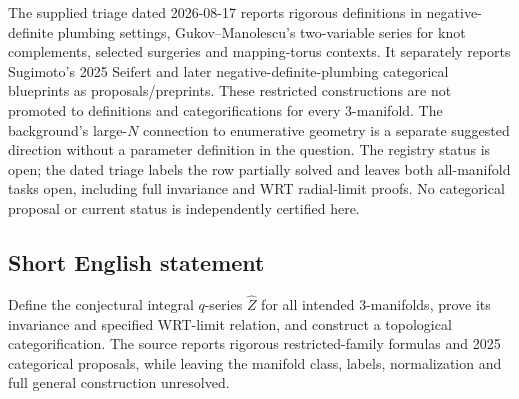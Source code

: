 \documentclass[11pt]{article}
\begin{document}
The supplied triage dated 2026-08-17 reports rigorous definitions in negative-definite plumbing settings, Gukov--Manolescu's two-variable series for knot complements, selected surgeries and mapping-torus contexts. It separately reports Sugimoto's 2025 Seifert and later negative-definite-plumbing categorical blueprints as proposals/preprints. These restricted constructions are not promoted to definitions and categorifications for every 3-manifold. The background's large-\(N\) connection to enumerative geometry is a separate suggested direction without a parameter definition in the question. The registry status is open; the dated triage labels the row partially solved and leaves both all-manifold tasks open, including full invariance and WRT radial-limit proofs. No categorical proposal or current status is independently certified here.
\subsection{Short English statement}
Define the conjectural integral \(q\)-series \(\widehat Z\) for all intended 3-manifolds, prove its invariance and specified WRT-limit relation, and construct a topological categorification. The source reports rigorous restricted-family formulas and 2025 categorical proposals, while leaving the manifold class, labels, normalization and full general construction unresolved.
\end{document}
